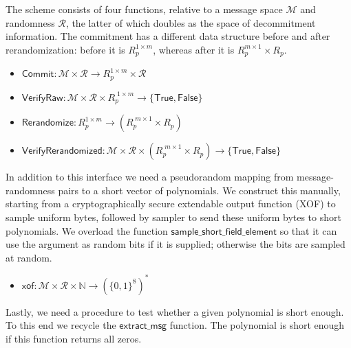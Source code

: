 The scheme consists of four functions, relative to a message space $\mathcal{M}$ and randomness $\mathcal{R}$, the latter of which doubles as the space of decommitment information. The commitment has a different data structure before and after rerandomization: before it is $R_p^{1 \times m}$, whereas after it is $R_p^{m \times 1} \times R_p$.
\begin{itemize}
\item $\mathsf{Commit} : \mathcal{M} \times \mathcal{R} \rightarrow R_p^{1 \times m} \times \mathcal{R}$
\item $\mathsf{VerifyRaw} : \mathcal{M} \times \mathcal{R} \times R_p^{\phantom{\vert}1 \times m} \rightarrow \{\mathsf{True},\mathsf{False}\}$
\item $\mathsf{Rerandomize} : R_p^{1 \times m} \rightarrow (R_p^{\phantom{\vert}m \times 1} \times R_p)$
\item $\mathsf{VerifyRerandomized} : \mathcal{M} \times \mathcal{R} \times (R_p^{\phantom{\vert}m \times 1} \times R_p) \rightarrow \{\mathsf{True},\mathsf{False}\}$
\end{itemize}
In addition to this interface we need a pseudorandom mapping from message-randomness pairs to a short vector of polynomials. We construct this manually, starting from a cryptographically secure extendable output function (XOF) to sample uniform bytes, followed by sampler to send these uniform bytes to short polynomials. We overload the function $\mathsf{sample\_short\_field\_element}$ so that it can use the argument as random bits if it is supplied; otherwise the bits are sampled at random.
\begin{itemize}
\item $\mathsf{xof} : \mathcal{M} \times \mathcal{R} \times \mathbb{N} \rightarrow (\{0, 1\}^8)^*$
\end{itemize}
Lastly, we need a procedure to test whether a given polynomial is short enough. To this end we recycle the $\mathsf{extract\_msg}$ function. The polynomial is short enough if this function returns all zeros.

